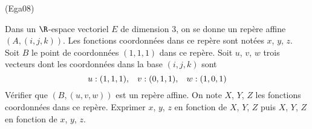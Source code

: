 \begin{tiny}(Ega08)\end{tiny} Dans un $\R$-espace vectoriel $E$ de dimension $3$, on se donne un repère affine $(A,(i,j,k))$. Les fonctions coordonnées dans ce repère sont notées $x$, $y$, $z$.\newline
Soit $B$ le point de coordonnées $(1,1,1)$ dans ce repère. Soit $u$, $v$, $w$ trois vecteurs dont les coordonnées dans la base $(i,j,k)$ sont
\begin{displaymath}
u:(1,1,1),\hspace{0.3cm} v:(0,1,1),\hspace{0.3cm} w:(1,0,1)  
\end{displaymath}
Vérifier que $(B,(u,v,w))$ est un repère affine. On note $X$, $Y$, $Z$ les fonctions coordonnées dans ce repère. Exprimer $x$, $y$, $z$ en fonction de $X$, $Y$, $Z$ puis $X$, $Y$, $Z$ en fonction de $x$, $y$, $z$.